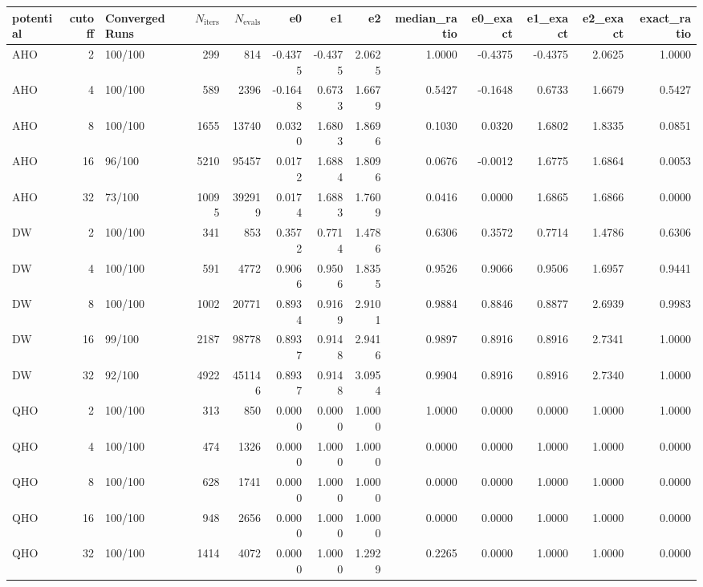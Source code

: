\begin{tabular}{lrlrrrrrrrrrr}
\toprule
potential & cutoff & Converged Runs & $N_{\text{iters}}$ & $N_{\text{evals}}$ & e0 & e1 & e2 & median_ratio & e0_exact & e1_exact & e2_exact & exact_ratio \\
\midrule
AHO & 2 & 100/100 & 299 & 814 & -0.4375 & -0.4375 & 2.0625 & 1.0000 & -0.4375 & -0.4375 & 2.0625 & 1.0000 \\
AHO & 4 & 100/100 & 589 & 2396 & -0.1648 & 0.6733 & 1.6679 & 0.5427 & -0.1648 & 0.6733 & 1.6679 & 0.5427 \\
AHO & 8 & 100/100 & 1655 & 13740 & 0.0320 & 1.6803 & 1.8696 & 0.1030 & 0.0320 & 1.6802 & 1.8335 & 0.0851 \\
AHO & 16 & 96/100 & 5210 & 95457 & 0.0172 & 1.6884 & 1.8096 & 0.0676 & -0.0012 & 1.6775 & 1.6864 & 0.0053 \\
AHO & 32 & 73/100 & 10095 & 392919 & 0.0174 & 1.6883 & 1.7609 & 0.0416 & 0.0000 & 1.6865 & 1.6866 & 0.0000 \\
DW & 2 & 100/100 & 341 & 853 & 0.3572 & 0.7714 & 1.4786 & 0.6306 & 0.3572 & 0.7714 & 1.4786 & 0.6306 \\
DW & 4 & 100/100 & 591 & 4772 & 0.9066 & 0.9506 & 1.8355 & 0.9526 & 0.9066 & 0.9506 & 1.6957 & 0.9441 \\
DW & 8 & 100/100 & 1002 & 20771 & 0.8934 & 0.9169 & 2.9101 & 0.9884 & 0.8846 & 0.8877 & 2.6939 & 0.9983 \\
DW & 16 & 99/100 & 2187 & 98778 & 0.8937 & 0.9148 & 2.9416 & 0.9897 & 0.8916 & 0.8916 & 2.7341 & 1.0000 \\
DW & 32 & 92/100 & 4922 & 451146 & 0.8937 & 0.9148 & 3.0954 & 0.9904 & 0.8916 & 0.8916 & 2.7340 & 1.0000 \\
QHO & 2 & 100/100 & 313 & 850 & 0.0000 & 0.0000 & 1.0000 & 1.0000 & 0.0000 & 0.0000 & 1.0000 & 1.0000 \\
QHO & 4 & 100/100 & 474 & 1326 & 0.0000 & 1.0000 & 1.0000 & 0.0000 & 0.0000 & 1.0000 & 1.0000 & 0.0000 \\
QHO & 8 & 100/100 & 628 & 1741 & 0.0000 & 1.0000 & 1.0000 & 0.0000 & 0.0000 & 1.0000 & 1.0000 & 0.0000 \\
QHO & 16 & 100/100 & 948 & 2656 & 0.0000 & 1.0000 & 1.0000 & 0.0000 & 0.0000 & 1.0000 & 1.0000 & 0.0000 \\
QHO & 32 & 100/100 & 1414 & 4072 & 0.0000 & 1.0000 & 1.2929 & 0.2265 & 0.0000 & 1.0000 & 1.0000 & 0.0000 \\
\bottomrule
\end{tabular}
